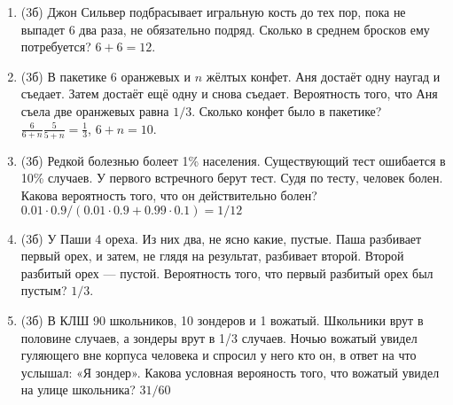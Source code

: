 \documentclass[a4paper, 12pt]{article}
\begin{document}
\begin{enumerate}
\item (3б) Джон Сильвер подбрасывает игральную кость до тех пор, пока не выпадет 6 два раза, не обязательно подряд. Сколько в среднем бросков ему потребуется? $6+6=12$.
\item (3б) В пакетике 6 оранжевых и $n$ жёлтых конфет. Аня достаёт одну наугад и съедает. Затем достаёт ещё одну и снова съедает. Вероятность того, что Аня съела две оранжевых равна $1/3$. Сколько конфет было в пакетике? $\frac{6}{6+n}\frac{5}{5+n}=\frac{1}{3}$, $6+n=10$.
\item (3б) Редкой болезнью болеет 1\% населения. Существующий тест ошибается в 10\% случаев. У первого встречного берут тест. Судя по тесту, человек болен. Какова вероятность того, что он действительно болен? $0.01\cdot 0.9/(0.01 \cdot 0.9 + 0.99 \cdot 0.1)=1/12$
\item (3б) У Паши 4 ореха. Из них два, не ясно какие, пустые. Паша разбивает первый орех, и затем, не глядя на результат, разбивает второй. Второй разбитый орех — пустой. Вероятность того, что первый разбитый орех был пустым? $1/3$.
\item (3б) В КЛШ 90 школьников, 10 зондеров и 1 вожатый. Школьники врут
в половине случаев, а зондеры врут в 1/3 случаев. Ночью вожатый увидел
гуляющего вне корпуса человека и спросил у него кто он,
в ответ на что услышал: «Я зондер».
Какова условная верояность того, что вожатый увидел на улице школьника? $31/60$
\end{enumerate}
\end{document}
